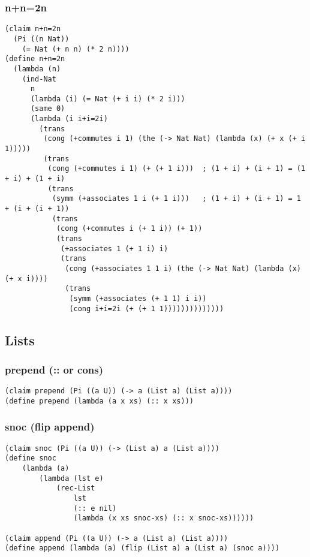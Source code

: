 \subsubsection{n+n=2n} \label{code:n+n=2n}
\begin{verbatim}
(claim n+n=2n
  (Pi ((n Nat))
    (= Nat (+ n n) (* 2 n))))
(define n+n=2n
  (lambda (n)
    (ind-Nat
      n
      (lambda (i) (= Nat (+ i i) (* 2 i)))
      (same 0)
      (lambda (i i+i=2i)
        (trans
         (cong (+commutes i 1) (the (-> Nat Nat) (lambda (x) (+ x (+ i 1)))))
         (trans
          (cong (+commutes i 1) (+ (+ 1 i)))  ; (1 + i) + (i + 1) = (1 + i) + (1 + i)
          (trans
           (symm (+associates 1 i (+ 1 i)))   ; (1 + i) + (i + 1) = 1 + (i + (i + 1))
           (trans
            (cong (+commutes i (+ 1 i)) (+ 1))
            (trans
             (+associates 1 (+ 1 i) i)
             (trans
              (cong (+associates 1 1 i) (the (-> Nat Nat) (lambda (x) (+ x i))))
              (trans
               (symm (+associates (+ 1 1) i i))
               (cong i+i=2i (+ (+ 1 1))))))))))))))
\end{verbatim}


\subsection{Lists}

\subsubsection{prepend (:: or cons)} \label{code:prepend}
\begin{verbatim}
(claim prepend (Pi ((a U)) (-> a (List a) (List a))))
(define prepend (lambda (a x xs) (:: x xs)))
\end{verbatim}

\subsubsection{snoc (flip append)} \label{code:snoc}
\begin{verbatim}
(claim snoc (Pi ((a U)) (-> (List a) a (List a))))
(define snoc
    (lambda (a)
        (lambda (lst e)
            (rec-List
                lst
                (:: e nil)
                (lambda (x xs snoc-xs) (:: x snoc-xs))))))

(claim append (Pi ((a U)) (-> a (List a) (List a))))
(define append (lambda (a) (flip (List a) a (List a) (snoc a))))
\end{verbatim}


